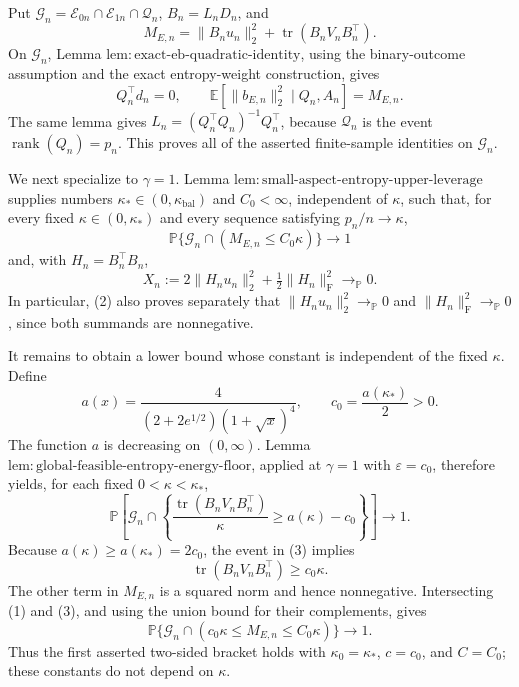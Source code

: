 Put \(\mathcal G_n=\mathcal E_{0n}\cap\mathcal E_{1n}\cap\mathcal Q_n\), \(B_n=L_nD_n\), and
\[
 M_{E,n}=\|B_nu_n\|_2^2+\operatorname{tr}(B_nV_nB_n^\top).
\]
On \(\mathcal G_n\), Lemma \(\mathrm{lem{:}exact\mbox{-}eb\mbox{-}quadratic\mbox{-}identity}\), using the binary-outcome assumption and the exact entropy-weight construction, gives
\[
 Q_n^\top d_n=0,
 \qquad
 \mathbb E\!\left[\|b_{E,n}\|_2^2\mid Q_n,A_n\right]=M_{E,n}.
\]
The same lemma gives \(L_n=(Q_n^\top Q_n)^{-1}Q_n^\top\), because \(\mathcal Q_n\) is the event \(\operatorname{rank}(Q_n)=p_n\).  This proves all of the asserted finite-sample identities on \(\mathcal G_n\).

We next specialize to \(\gamma=1\).  Lemma \(\mathrm{lem{:}small\mbox{-}aspect\mbox{-}entropy\mbox{-}upper\mbox{-}leverage}\) supplies numbers \(\kappa_*\in(0,\kappa_{\mathrm{bal}})\) and \(C_0<\infty\), independent of \(\kappa\), such that, for every fixed \(\kappa\in(0,\kappa_*)\) and every sequence satisfying \(p_n/n\to\kappa\),
\[
 \mathbb P\{\mathcal G_n\cap(M_{E,n}\le C_0\kappa)\}\longrightarrow1
 \tag{1}
\]
and, with \(H_n=B_n^\top B_n\),
\[
 X_n:=2\|H_nu_n\|_2^2+\tfrac12\|H_n\|_{\mathrm F}^2
 \longrightarrow_{\mathbb P}0.
 \tag{2}
\]
In particular, (2) also proves separately that \(\|H_nu_n\|_2^2\to_{\mathbb P}0\) and \(\|H_n\|_{\mathrm F}^2\to_{\mathbb P}0\), since both summands are nonnegative.

It remains to obtain a lower bound whose constant is independent of the fixed \(\kappa\).  Define
\[
 a(x)=\frac{4}{(2+2e^{1/2})(1+\sqrt{x})^4},
 \qquad
 c_0=\frac{a(\kappa_*)}{2}>0.
\]
The function \(a\) is decreasing on \((0,\infty)\).  Lemma \(\mathrm{lem{:}global\mbox{-}feasible\mbox{-}entropy\mbox{-}energy\mbox{-}floor}\), applied at \(\gamma=1\) with \(\varepsilon=c_0\), therefore yields, for each fixed \(0<\kappa<\kappa_*\),
\[
 \mathbb P\!\left[
  \mathcal G_n\cap
  \left\{
   \frac{\operatorname{tr}(B_nV_nB_n^\top)}{\kappa}
   \ge a(\kappa)-c_0
  \right\}
 \right]\longrightarrow1.
 \tag{3}
\]
Because \(a(\kappa)\ge a(\kappa_*)=2c_0\), the event in (3) implies
\[
 \operatorname{tr}(B_nV_nB_n^\top)\ge c_0\kappa.
\]
The other term in \(M_{E,n}\) is a squared norm and hence nonnegative.  Intersecting (1) and (3), and using the union bound for their complements, gives
\[
 \mathbb P\{\mathcal G_n\cap(c_0\kappa\le M_{E,n}\le C_0\kappa)\}
 \longrightarrow1.
 \tag{4}
\]
Thus the first asserted two-sided bracket holds with \(\kappa_0=\kappa_*\), \(c=c_0\), and \(C=C_0\); these constants do not depend on \(\kappa\).

